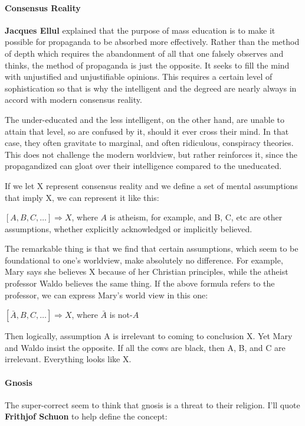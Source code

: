 \paragraph{Consensus Reality}
\textbf{Jacques Ellul} explained that the purpose of mass education is to make it possible for propaganda to be absorbed more effectively. Rather than the method of depth which requires the abandonment of all that one falsely observes and thinks, the method of propaganda is just the opposite. It seeks to fill the mind with unjustified and unjustifiable opinions. This requires a certain level of sophistication so that is why the intelligent and the degreed are nearly always in accord with modern consensus reality.

The under-educated and the less intelligent, on the other hand, are unable to attain that level, so are confused by it, should it ever cross their mind. In that case, they often gravitate to marginal, and often ridiculous, conspiracy theories. This does not challenge the modern worldview, but rather reinforces it, since the propagandized can gloat over their intelligence compared to the uneducated.

If we let X represent consensus reality and we define a set of mental assumptions that imply X, we can represent it like this:

$[A,B,C,…] \Rightarrow  X$, where $A$ is atheism, for example, and B, C, etc are other assumptions, whether explicitly acknowledged or implicitly believed.

The remarkable thing is that we find that certain assumptions, which seem to be foundational to one's worldview, make absolutely no difference. For example, Mary says she believes X because of her Christian principles, while the atheist professor Waldo believes the same thing. If the above formula refers to the professor, we can express Mary's world view in this one:

$[\bar A,B,C,…] \Rightarrow  X$, where $\bar A$ is not-$A$

Then logically, assumption A is irrelevant to coming to conclusion X. Yet Mary and Waldo insist the opposite. If all the cows are black, then A, B, and C are irrelevant. Everything looks like X.

\paragraph{Gnosis}
The super-correct seem to think that gnosis is a threat to their religion. I'll quote \textbf{Frithjof Schuon} to help define the concept:

